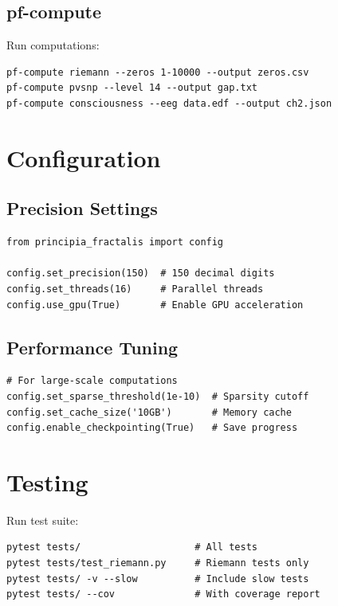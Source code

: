 \subsection{pf-compute}

Run computations:

\begin{verbatim}
pf-compute riemann --zeros 1-10000 --output zeros.csv
pf-compute pvsnp --level 14 --output gap.txt
pf-compute consciousness --eeg data.edf --output ch2.json
\end{verbatim}

\section{Configuration}

\subsection{Precision Settings}

\begin{verbatim}
from principia_fractalis import config

config.set_precision(150)  # 150 decimal digits
config.set_threads(16)     # Parallel threads
config.use_gpu(True)       # Enable GPU acceleration
\end{verbatim}

\subsection{Performance Tuning}

\begin{verbatim}
# For large-scale computations
config.set_sparse_threshold(1e-10)  # Sparsity cutoff
config.set_cache_size('10GB')       # Memory cache
config.enable_checkpointing(True)   # Save progress
\end{verbatim}

\section{Testing}

Run test suite:

\begin{verbatim}
pytest tests/                    # All tests
pytest tests/test_riemann.py     # Riemann tests only
pytest tests/ -v --slow          # Include slow tests
pytest tests/ --cov              # With coverage report
\end{verbatim}

